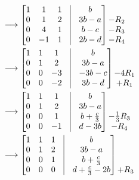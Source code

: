 \documentclass[final,expand]{problemset}
\begin{document}
{\begin{align*}
			&\longrightarrow
			\begin{bmatrix}
				1 & 1 & 1 &\vline& b\\ 0 & 1 & 2 &\vline& 3b - a\\ 0 & 4 &1 &\vline& b - c\\ 0 & -1 & 1 &\vline& 2b - d
			\end{bmatrix}\begin{matrix}
				 \\ -R_2 \\ -R_3\\ -R_4\\
			\end{matrix}\\
			&\longrightarrow
			\begin{bmatrix}
				1 & 1 & 1 &\vline& b \\ 0 & 1 & 2 &\vline& 3b - a\\ 0 & 0 & -3 &\vline& -3b-c\\ 0 & 0 & -2 &\vline& 3b - d
			\end{bmatrix}\begin{matrix}
				 \\  \\ -4R_1\\ +R_1\\
			\end{matrix}\\
			&\longrightarrow
			\begin{bmatrix}
				1 & 1 & 1  &\vline& b\\ 0 & 1 & 2 &\vline& 3b-a\\ 0 & 0 & 1 &\vline& b + \frac{c}{3}\\ 0 & 0 & -1 &\vline& d - 3b
			\end{bmatrix}\begin{matrix}
				 \\  \\ -\frac{1}{3}R_3\\ -R_4\\
			\end{matrix}\\
			&\longrightarrow
			\begin{bmatrix}
				1 & 1 & 1 &\vline& b\\ 0 & 1 & 2&\vline& 3b-a \\ 0 & 0 & 1 &\vline& b + \frac{c}{3}\\ 0 & 0 & 0 &\vline& d + \frac{c}{3} - 2b
			\end{bmatrix}\begin{matrix}
				 \\  \\ \\ +R_3\\

\end{matrix}
\end{align*}}
\end{document}

